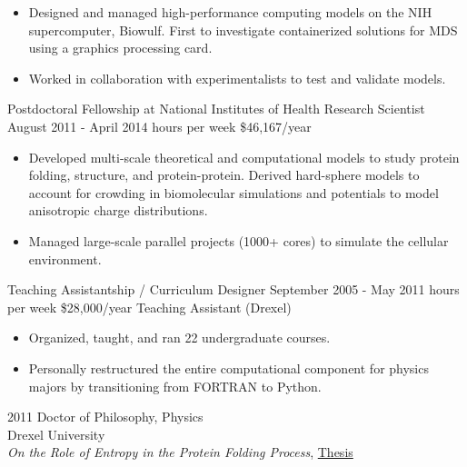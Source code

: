 \documentclass[]{scrartcl}
\begin{document}
\begin{cleanCV}
{\begin{itemize}
  \item Designed and managed high-performance computing models on the NIH supercomputer, Biowulf. First to investigate containerized solutions for MDS using a graphics processing card.

  \item Worked in collaboration with experimentalists to test and validate models. 

  \end{itemize}
}


\WorkExperience
{}
{Postdoctoral Fellowship at National Institutes of Health}
{\newline Research Scientist}
{
  \newline August 2011 - April 2014
   hours per week
  \newline \$46,167/year
}
{
  \begin{itemize}
  \item Developed multi-scale theoretical and computational models to study protein folding, structure, and protein-protein. Derived hard-sphere models to account for crowding in biomolecular simulations and potentials to model anisotropic charge distributions.
  \item Managed large-scale parallel projects (1000+ cores) to simulate the cellular environment.
  \end{itemize}
}

\WorkExperience{}
{\newline Teaching Assistantship / Curriculum Designer}
{
  \newline September 2005 - May 2011
   hours per week
  \newline \$28,000/year
}   
{Teaching Assistant (Drexel)}

{
  \begin{itemize}
  \item   Organized, taught, and ran 22 undergraduate courses.
  \item   Personally restructured the entire computational component for physics majors by transitioning from FORTRAN to Python.
  \end{itemize}
}




\WorkExperience
{2011}
{Doctor of Philosophy, Physics}
{
\\Drexel University
\\\emph{On the Role of Entropy in the Protein Folding Process}, \href{https://idea.library.drexel.edu/islandora/object/idea:3488}{Thesis}
}


\end{cleanCV}
\end{document}
